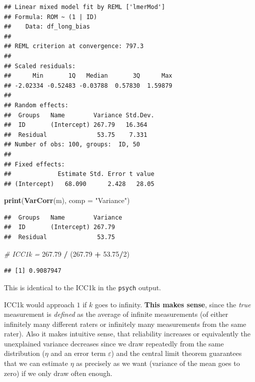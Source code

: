 \documentclass[
]{book}
\newenvironment{Shaded}{\begin{snugshade}}{\end{snugshade}}
\newcommand{\AttributeTok}[1]{\textcolor[rgb]{0.13,0.29,0.53}{#1}}
\newcommand{\CommentTok}[1]{\textcolor[rgb]{0.56,0.35,0.01}{\textit{#1}}}
\newcommand{\DecValTok}[1]{\textcolor[rgb]{0.00,0.00,0.81}{#1}}
\newcommand{\FloatTok}[1]{\textcolor[rgb]{0.00,0.00,0.81}{#1}}
\newcommand{\FunctionTok}[1]{\textcolor[rgb]{0.13,0.29,0.53}{\textbf{#1}}}
\newcommand{\NormalTok}[1]{#1}
\newcommand{\SpecialCharTok}[1]{\textcolor[rgb]{0.81,0.36,0.00}{\textbf{#1}}}
\newcommand{\StringTok}[1]{\textcolor[rgb]{0.31,0.60,0.02}{#1}}
\begin{document}
\begin{verbatim}
## Linear mixed model fit by REML ['lmerMod']
## Formula: ROM ~ (1 | ID)
##    Data: df_long_bias
## 
## REML criterion at convergence: 797.3
## 
## Scaled residuals: 
##      Min       1Q   Median       3Q      Max 
## -2.02334 -0.52483 -0.03788  0.57830  1.59879 
## 
## Random effects:
##  Groups   Name        Variance Std.Dev.
##  ID       (Intercept) 267.79   16.364  
##  Residual              53.75    7.331  
## Number of obs: 100, groups:  ID, 50
## 
## Fixed effects:
##             Estimate Std. Error t value
## (Intercept)   68.090      2.428   28.05
\end{verbatim}

\begin{Shaded}
\begin{Highlighting}[]
\FunctionTok{print}\NormalTok{(}\FunctionTok{VarCorr}\NormalTok{(m), }\AttributeTok{comp =} \StringTok{"Variance"}\NormalTok{)}
\end{Highlighting}
\end{Shaded}

\begin{verbatim}
##  Groups   Name        Variance
##  ID       (Intercept) 267.79  
##  Residual              53.75
\end{verbatim}

\begin{Shaded}
\begin{Highlighting}[]
\CommentTok{\# ICC1k = }
\FloatTok{267.79} \SpecialCharTok{/}\NormalTok{ (}\FloatTok{267.79} \SpecialCharTok{+} \FloatTok{53.75}\SpecialCharTok{/}\DecValTok{2}\NormalTok{)}
\end{Highlighting}
\end{Shaded}

\begin{verbatim}
## [1] 0.9087947
\end{verbatim}

This is identical to the ICC1k in the \texttt{psych} output.

ICC1k would approach \(1\) if \(k\) goes to infinity.
\textbf{This makes sense}, since the \emph{true} measurement is \emph{defined} as the average of
infinite measurements (of either infinitely many different raters or infinitely many
measurements from the same rater).
Also it makes intuitive sense, that
reliability increases or equivalently the unexplained variance decreases
since we draw repeatedly from the same distribution (\(\eta\) and an error term \(\varepsilon\))
and the central limit theorem guarantees that we can estimate \(\eta\) as precisely
as we want (variance of the mean goes to zero) if we only draw often enough.
\end{document}
